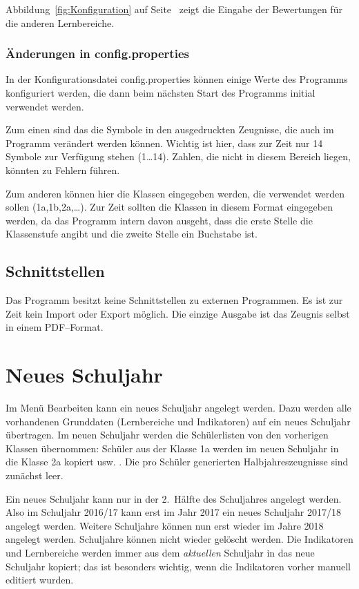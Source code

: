 \documentclass[a4paper,notitlepage,parskip]{scrartcl}
\newcommand\ott{\normalfont\ttfamily}
\begin{document}
Abbildung~\ref{fig:Konfiguration} auf Seite~\pageref{fig:Konfiguration} zeigt die Eingabe der Bewertungen für die anderen Lernbereiche.

\subsubsection{Änderungen in {\ott config.properties}}
\label{configKlassen}
In der Konfigurationsdatei {\ott config.properties} können einige Werte des Programms konfiguriert werden, die dann beim nächsten Start des Programms initial verwendet werden.

Zum einen sind das die Symbole in den ausgedruckten Zeugnisse, die auch im Programm verändert werden können.
Wichtig ist hier, dass zur Zeit nur 14 Symbole zur Verfügung stehen (1\dots14). Zahlen, die nicht in diesem Bereich liegen, könnten zu Fehlern führen.

Zum anderen können hier die Klassen eingegeben werden, die verwendet werden sollen (1a,1b,2a,\dots).
Zur Zeit sollten die Klassen in diesem Format eingegeben werden, da das Programm intern davon ausgeht, dass die erste Stelle die Klassenstufe angibt und die zweite Stelle ein Buchstabe ist.

\subsection{Schnittstellen}
Das Programm besitzt keine Schnittstellen zu externen Programmen. Es ist zur Zeit kein Import oder Export möglich.
Die einzige Ausgabe ist das Zeugnis selbst in einem PDF--Format.

\section{Neues Schuljahr}
Im Menü {\ott Bearbeiten} kann ein neues Schuljahr angelegt werden. Dazu werden alle vorhandenen Grunddaten (Lernbereiche und Indikatoren) auf ein neues Schuljahr übertragen.
Im neuen Schuljahr werden die Schülerlisten von den vorherigen Klassen übernommen:
Schüler aus der Klasse 1a werden im neuen Schuljahr in die Klasse 2a kopiert usw. .
Die pro Schüler generierten Halbjahreszeugnisse sind zunächst leer.

Ein neues Schuljahr kann nur in der 2.~Hälfte des Schuljahres angelegt werden.
Also im Schuljahr 2016/17 kann erst im Jahr 2017 ein neues Schuljahr 2017/18 angelegt werden. Weitere Schuljahre können nun erst wieder im Jahre 2018 angelegt werden. Schuljahre können nicht wieder gelöscht werden.
Die Indikatoren und Lernbereiche werden immer aus dem \emph{aktuellen} Schuljahr in das neue Schuljahr kopiert; das ist besonders wichtig, wenn die Indikatoren vorher manuell editiert wurden.
\end{document}
